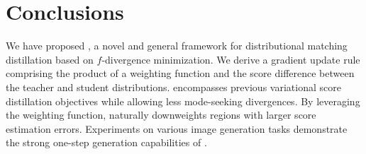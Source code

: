 \vspace{-2pt}
\section{Conclusions}
\vspace{-2pt}
We have proposed \method, a novel and general framework for distributional matching distillation based on $f$-divergence minimization. We derive a gradient update rule comprising the product of a weighting function and the score difference between the teacher and student distributions. \methodtext encompasses previous variational score distillation objectives while allowing less mode-seeking divergences. By leveraging the weighting function, \methodtext naturally downweights regions with larger score estimation errors.  Experiments on various image generation tasks demonstrate the strong one-step generation capabilities of \method. 
